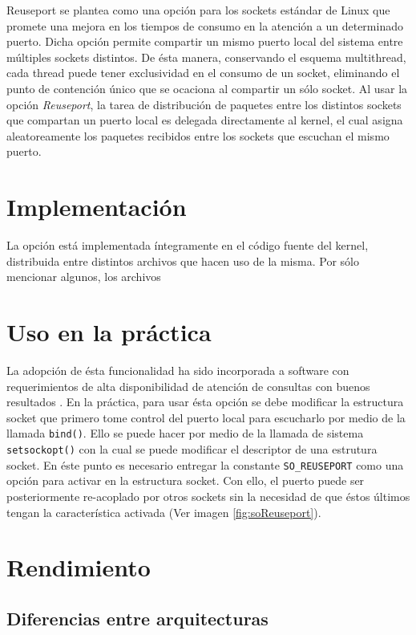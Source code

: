 Reuseport se plantea como una opción para los sockets estándar de Linux que promete una mejora en los tiempos de consumo en la atención a un determinado puerto. Dicha opción permite compartir un mismo puerto local del sistema entre múltiples sockets distintos. De ésta manera, conservando el esquema multithread, cada thread puede tener exclusividad en el consumo de un socket, eliminando el punto de contención único que se ocaciona al compartir un sólo socket. Al usar la opción \emph{Reuseport}, la tarea de distribución de paquetes entre los distintos sockets que compartan un puerto local es delegada directamente al kernel, el cual asigna aleatoreamente los paquetes recibidos entre los sockets que escuchan el mismo puerto.

\section{Implementación}
La opción está implementada íntegramente en el código fuente del kernel, distribuida entre distintos archivos que hacen uso de la misma. Por sólo mencionar algunos, los archivos 


\section{Uso en la práctica}
La adopción de ésta funcionalidad ha sido incorporada a software con requerimientos de alta disponibilidad de atención de consultas con buenos resultados \cite{paper:apache}. En la práctica, para usar ésta opción se debe modificar la estructura socket que primero tome control del puerto local para escucharlo por medio de la llamada \verb=bind()=. Ello se puede hacer por medio de la llamada de sistema \verb=setsockopt()= con la cual se puede modificar el descriptor de una estrutura socket. En éste punto es necesario entregar la constante \verb=SO_REUSEPORT= como una opción para activar en la estructura socket. Con ello, el puerto puede ser posteriormente re-acoplado por otros sockets sin la necesidad de que éstos últimos tengan la característica activada (Ver imagen \ref{fig:soReuseport}).

\section{Rendimiento}

\subsection{Diferencias entre arquitecturas}


